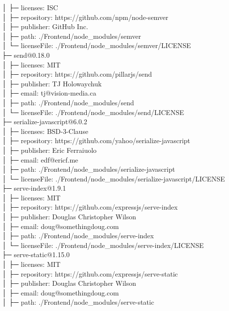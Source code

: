 │  ├─ licenses: ISC\\
│  ├─ repository: https://github.com/npm/node-semver\\
│  ├─ publisher: GitHub Inc.\\
│  ├─ path: ./Frontend/node\_modules/semver\\
│  └─ licenseFile: ./Frontend/node\_modules/semver/LICENSE\\
├─ send@0.18.0\\
│  ├─ licenses: MIT\\
│  ├─ repository: https://github.com/pillarjs/send\\
│  ├─ publisher: TJ Holowaychuk\\
│  ├─ email: tj@vision-media.ca\\
│  ├─ path: ./Frontend/node\_modules/send\\
│  └─ licenseFile: ./Frontend/node\_modules/send/LICENSE\\
├─ serialize-javascript@6.0.2\\
│  ├─ licenses: BSD-3-Clause\\
│  ├─ repository: https://github.com/yahoo/serialize-javascript\\
│  ├─ publisher: Eric Ferraiuolo\\
│  ├─ email: edf@ericf.me\\
│  ├─ path: ./Frontend/node\_modules/serialize-javascript\\
│  └─ licenseFile: ./Frontend/node\_modules/serialize-javascript/LICENSE\\
├─ serve-index@1.9.1\\
│  ├─ licenses: MIT\\
│  ├─ repository: https://github.com/expressjs/serve-index\\
│  ├─ publisher: Douglas Christopher Wilson\\
│  ├─ email: doug@somethingdoug.com\\
│  ├─ path: ./Frontend/node\_modules/serve-index\\
│  └─ licenseFile: ./Frontend/node\_modules/serve-index/LICENSE\\
├─ serve-static@1.15.0\\
│  ├─ licenses: MIT\\
│  ├─ repository: https://github.com/expressjs/serve-static\\
│  ├─ publisher: Douglas Christopher Wilson\\
│  ├─ email: doug@somethingdoug.com\\
│  ├─ path: ./Frontend/node\_modules/serve-static\\
